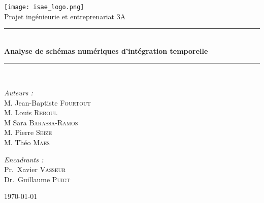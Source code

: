 \documentclass[a4paper,12pt]{report}
\theoremstyle{break}
\begin{document}

\begin{titlepage}
\begin{center}

\texttt{[image: isae\_logo.png]}\\[1cm]

{\large Projet ingénieurie et entreprenariat 3A}\\[0.5cm]


\rule{\linewidth}{0.5mm} \\[0.4cm]
{\huge \bfseries Analyse de schémas numériques d'intégration temporelle \\[0.4cm] }
\rule{\linewidth}{0.5mm} \\[1.5cm]

\noindent
\begin{minipage}{0.4\textwidth}
  \begin{flushleft} \large
    \emph{Auteurs :}\\
    M. Jean-Baptiste \textsc{Fourtout}\\
    M. Louis \textsc{Reboul}\\
    M Sara \textsc{Barassa-Ramos}\\
    M. Pierre \textsc{Seize} \\
    M. Théo   \textsc{Maes}
  \end{flushleft}
\end{minipage}%
\begin{minipage}{0.4\textwidth}
  \begin{flushright} \large
    \emph{Encadrants :} \\
    Pr.~Xavier \textsc{Vasseur}\\
    Dr.~Guillaume \textsc{Puigt}
  \end{flushright}
\end{minipage}

\vfill

\today
\end{center}
\end{titlepage}  

\tableofcontents
\end{document}
